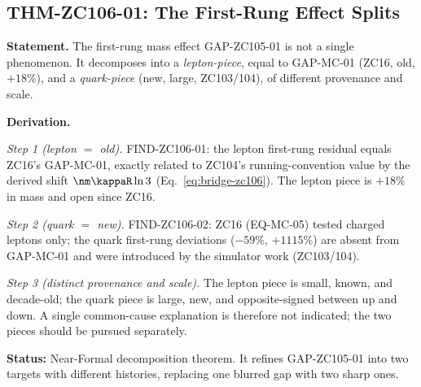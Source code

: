 \documentclass[12pt, a4paper]{article}
\begin{document}

\subsection{THM-ZC106-01: The First-Rung Effect Splits}
\label{sec:thm-zc106}

\begin{formalbox}[title={THM-ZC106-01: GAP-ZC105-01 decomposes into an old and a new gap
  ($R_1$, Near-Formal)}]

\textbf{Statement.} The first-rung mass effect GAP-ZC105-01 is not a single
phenomenon. It decomposes into a \emph{lepton-piece}, equal to GAP-MC-01 (ZC16,
old, $+18\%$), and a \emph{quark-piece} (new, large, ZC103/104), of different
provenance and scale.

\textbf{Derivation.}

\textit{Step 1 (lepton $=$ old).} FIND-ZC106-01: the lepton first-rung residual
equals ZC16's GAP-MC-01, exactly related to ZC104's running-convention value by
the derived shift $\nm\kappaR\ln 3$ (Eq.~\ref{eq:bridge-zc106}). The lepton piece is
$+18\%$ in mass and open since ZC16.

\textit{Step 2 (quark $=$ new).} FIND-ZC106-02: ZC16 (EQ-MC-05) tested charged
leptons only; the quark first-rung deviations ($-59\%$, $+1115\%$) are absent
from GAP-MC-01 and were introduced by the simulator work (ZC103/104).

\textit{Step 3 (distinct provenance and scale).} The lepton piece is small,
known, and decade-old; the quark piece is large, new, and opposite-signed between
up and down. A single common-cause explanation is therefore not indicated; the
two pieces should be pursued separately.

\textbf{Status:} Near-Formal decomposition theorem. It refines GAP-ZC105-01 into
two targets with different histories, replacing one blurred gap with two sharp
ones.
\end{formalbox}
\end{document}
